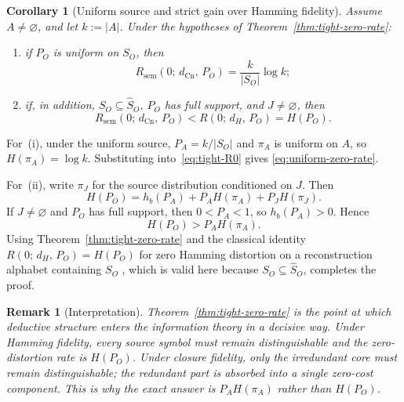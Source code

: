 \documentclass[journal,onecolumn]{IEEEtran}
\makeatletter
\newcommand{\Cn}{\text{Cn}}
\newtheorem{corollary}{Corollary}[section]
\newtheorem{remark}{Remark}[section]
\numberwithin{equation}{section}
\renewenvironment{proof}[1][\proofname]{\par
  \pushQED{\qed}%
  \normalfont \topsep6\p@\@plus6\p@\relax
  \trivlist
  \item[\hskip\labelsep
        \itshape
    #1\@addpunct{.}]\ignorespaces
}{%
  \popQED\endtrivlist\@endpefalse
}
\makeatother
\begin{document}
\begin{corollary}[Uniform source and strict gain over Hamming fidelity]
\label{cor:zero-rate-gain}
Assume \(A\neq\varnothing\), and let \(k:=|A|\).
Under the hypotheses of
Theorem~\ref{thm:tight-zero-rate}:
\begin{enumerate}[label=\textup{(\roman*)}]
  \item if \(P_O\) is uniform on \(S_O\), then
        \begin{equation}\label{eq:uniform-zero-rate}
          R_{\mathrm{sem}}(0;\,d_{\Cn},\,P_O)
          =
          \frac{k}{|S_O|}\log k;
        \end{equation}
  \item if, in addition, \(S_O\subseteq\hat S_O\),
        \(P_O\) has full support, and \(J\neq\varnothing\), then
        \begin{equation}\label{eq:zero-rate-ratio}
          R_{\mathrm{sem}}(0;\,d_{\Cn},\,P_O)
          <
          R(0;\,d_H,\,P_O)
          =
          H(P_O).
        \end{equation}
\end{enumerate}
\end{corollary}

\begin{proof}
For~\textup{(i)}, under the uniform source,
\(P_A=k/|S_O|\) and \(\pi_A\) is uniform on \(A\), so
\(H(\pi_A)=\log k\).
Substituting into~\eqref{eq:tight-R0} gives
\eqref{eq:uniform-zero-rate}.

For~\textup{(ii)}, write \(\pi_J\) for the source distribution
conditioned on \(J\).
Then
\[
  H(P_O)
  =
  h_b(P_A)+P_A H(\pi_A)+P_J H(\pi_J).
\]
If \(J\neq\varnothing\) and \(P_O\) has full support, then
\(0<P_A<1\), so \(h_b(P_A)>0\).
Hence
\[
  H(P_O)>P_A H(\pi_A).
\]
Using Theorem~\ref{thm:tight-zero-rate} and the classical identity
\(R(0;\,d_H,\,P_O)=H(P_O)\) for zero Hamming distortion on a
reconstruction alphabet containing \(S_O\)
\cite[Ch.~5]{cover2006elements}\cite[Ch.~7]{csiszar2011information},
which is valid here because \(S_O\subseteq\hat S_O\), completes the
proof.
\end{proof}

\begin{remark}[Interpretation]
\label{rem:why-proof-system}
Theorem~\ref{thm:tight-zero-rate} is the point at which deductive
structure enters the information theory in a decisive way.
Under Hamming fidelity, every source symbol must remain
distinguishable and the zero-distortion rate is \(H(P_O)\).
Under closure fidelity, only the irredundant core must remain
distinguishable; the redundant part is absorbed into a single
zero-cost component.
This is why the exact answer is \(P_A H(\pi_A)\) rather than
\(H(P_O)\).
\end{remark}
\end{document}
